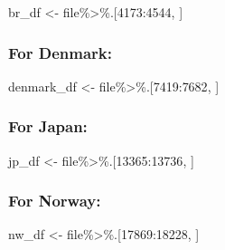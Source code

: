 \documentclass[
]{article}
\newenvironment{Shaded}{\begin{snugshade}}{\end{snugshade}}
\newcommand{\DecValTok}[1]{\textcolor[rgb]{0.00,0.00,0.81}{#1}}
\newcommand{\NormalTok}[1]{#1}
\newcommand{\OtherTok}[1]{\textcolor[rgb]{0.56,0.35,0.01}{#1}}
\newcommand{\SpecialCharTok}[1]{\textcolor[rgb]{0.00,0.00,0.00}{#1}}
\begin{document}
\begin{Shaded}
\begin{Highlighting}[]
\NormalTok{br\_df }\OtherTok{\textless{}{-}}\NormalTok{ file}\SpecialCharTok{\%\textgreater{}\%}\NormalTok{.[}\DecValTok{4173}\SpecialCharTok{:}\DecValTok{4544}\NormalTok{, ]}
\end{Highlighting}
\end{Shaded}

\hypertarget{for-denmark}{%
\subsubsection{For Denmark:}\label{for-denmark}}

\begin{Shaded}
\begin{Highlighting}[]
\NormalTok{denmark\_df }\OtherTok{\textless{}{-}}\NormalTok{ file}\SpecialCharTok{\%\textgreater{}\%}\NormalTok{.[}\DecValTok{7419}\SpecialCharTok{:}\DecValTok{7682}\NormalTok{, ]}
\end{Highlighting}
\end{Shaded}

\hypertarget{for-japan}{%
\subsubsection{For Japan:}\label{for-japan}}

\begin{Shaded}
\begin{Highlighting}[]
\NormalTok{jp\_df }\OtherTok{\textless{}{-}}\NormalTok{ file}\SpecialCharTok{\%\textgreater{}\%}\NormalTok{.[}\DecValTok{13365}\SpecialCharTok{:}\DecValTok{13736}\NormalTok{, ]}
\end{Highlighting}
\end{Shaded}

\hypertarget{for-norway}{%
\subsubsection{For Norway:}\label{for-norway}}

\begin{Shaded}
\begin{Highlighting}[]
\NormalTok{nw\_df }\OtherTok{\textless{}{-}}\NormalTok{ file}\SpecialCharTok{\%\textgreater{}\%}\NormalTok{.[}\DecValTok{17869}\SpecialCharTok{:}\DecValTok{18228}\NormalTok{, ]}
\end{Highlighting}
\end{Shaded}
\end{document}
